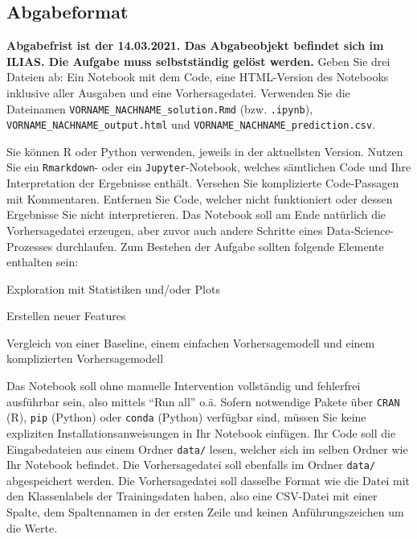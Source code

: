\documentclass[headinclude,headsepline]{scrartcl}
\newcommand{\code}[1]{{\color[HTML]{000080}\texttt{#1}}}
\begin{document}
\subsection{Abgabeformat}

\textbf{
	Abgabefrist ist der 14.03.2021.
	Das Abgabeobjekt befindet sich im ILIAS.
	Die Aufgabe muss selbstständig gelöst werden.
}
Geben Sie drei Dateien ab: Ein Notebook mit dem Code, eine HTML-Version des Notebooks inklusive aller Ausgaben und eine Vorhersagedatei.
Verwenden Sie die Dateinamen \code{VORNAME\_NACHNAME\_solution.Rmd} (bzw. \code{.ipynb}), \code{VORNAME\_NACHNAME\_output.html} und \code{VORNAME\_NACHNAME\_prediction.csv}.

Sie können R oder Python verwenden, jeweils in der aktuellsten Version.
Nutzen Sie ein \code{Rmarkdown}- oder ein \code{Jupyter}-Notebook, welches sämtlichen Code und Ihre Interpretation der Ergebnisse enthält.
Versehen Sie komplizierte Code-Passagen mit Kommentaren.
Entfernen Sie Code, welcher nicht funktioniert oder dessen Ergebnisse Sie nicht interpretieren.
Das Notebook soll am Ende natürlich die Vorhersagedatei erzeugen, aber zuvor auch andere Schritte eines Data-Science-Prozesses durchlaufen.
Zum Bestehen der Aufgabe sollten folgende Elemente enthalten sein:

\begin{compactenum}
	\item Exploration mit Statistiken und/oder Plots
	\item Erstellen neuer Features
	\item Vergleich von einer Baseline, einem einfachen Vorhersagemodell und einem komplizierten Vorhersagemodell
\end{compactenum}

Das Notebook soll ohne manuelle Intervention vollständig und fehlerfrei ausführbar sein, also mittels ``Run all'' o.ä.
Sofern notwendige Pakete über \code{CRAN} (R), \code{pip} (Python) oder \code{conda} (Python) verfügbar sind, müssen Sie keine expliziten Installationsanweisungen in Ihr Notebook einfügen.
Ihr Code soll die Eingabedateien aus einem Ordner \code{data/} lesen, welcher sich im selben Ordner wie Ihr Notebook befindet.
Die Vorhersagedatei soll ebenfalls im Ordner \code{data/} abgespeichert werden.
Die Vorhersagedatei soll dasselbe Format wie die Datei mit den Klassenlabels der Trainingsdaten haben,
also eine CSV-Datei mit einer Spalte, dem Spaltennamen in der ersten Zeile und keinen Anführungszeichen um die Werte.
\end{document}
